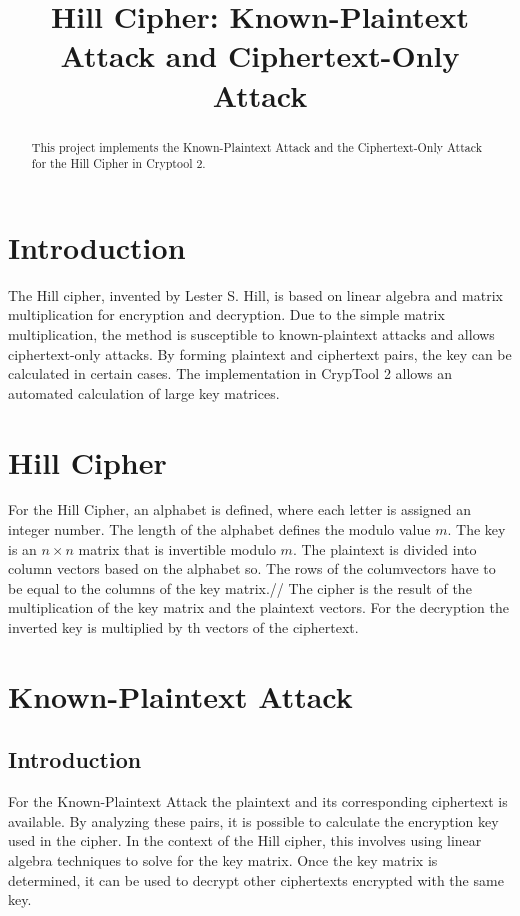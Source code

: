 \documentclass[conference]{IEEEtran}
\begin{document}
\title{Hill Cipher: Known-Plaintext Attack and Ciphertext-Only Attack\\}

\author{
}

\maketitle

\begin{abstract}
This project implements the Known-Plaintext Attack and the Ciphertext-Only Attack for the Hill Cipher in Cryptool 2. 
\end{abstract}

\section{Introduction}
The Hill cipher, invented by Lester S. Hill, is based on linear algebra and matrix multiplication for encryption and decryption. 
Due to the simple matrix multiplication, the method is susceptible to known-plaintext attacks and allows ciphertext-only 
attacks. By forming plaintext and ciphertext pairs, the key can be calculated in certain cases. The implementation in CrypTool 2 
allows an automated calculation of large key matrices.

\section{Hill Cipher}

For the Hill Cipher, an alphabet is defined, where each letter is assigned an integer number. The length of the alphabet defines the modulo value \( m \). The key is an \( n \times n \) matrix that is invertible modulo \( m \). The plaintext is divided into column vectors based on the alphabet so. The rows of the columvectors have to be equal to the columns of the key matrix.//
The cipher is the result of the multiplication of the key matrix and the plaintext vectors. For the decryption the inverted key is multiplied by th vectors of the ciphertext.

\section{Known-Plaintext Attack}
\subsection{Introduction}
For the Known-Plaintext Attack the plaintext and its corresponding ciphertext is available. By analyzing these pairs, it is possible to calculate the encryption key used in the cipher. In the context of the Hill cipher, this involves using linear algebra techniques to solve for the key matrix. Once the key matrix is determined, it can be used to decrypt other ciphertexts encrypted with the same key.
\end{document}

